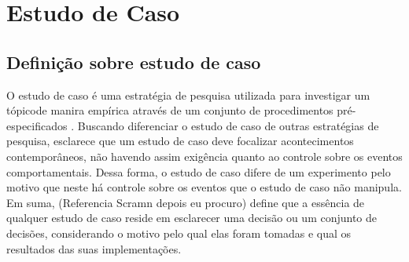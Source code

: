 \chapter{Estudo de Caso}

\section{Definição sobre estudo de caso}

O estudo de caso é uma estratégia de pesquisa utilizada para investigar um tópicode manira empírica através de um conjunto de procedimentos pré-especificados \cite{yin2001estudo}. Buscando diferenciar o estudo de caso de outras estratégias de pesquisa,  esclarece que um estudo de caso deve focalizar acontecimentos contemporâneos, não havendo assim exigência quanto ao controle sobre os eventos comportamentais. Dessa forma, o estudo de caso difere de um experimento pelo motivo que neste há controle sobre os eventos que o estudo de caso não manipula. Em suma, (Referencia Scramn depois eu procuro) define que a essência de qualquer estudo de caso reside em esclarecer uma decisão ou um conjunto de decisões, considerando o motivo pelo qual elas foram tomadas e qual os resultados das suas implementações.



\label{estudo de caso}

